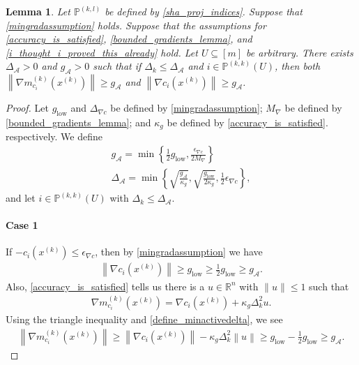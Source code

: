 \documentclass{article}
\newtheorem{lemma}[theorem]{Lemma}
\theoremstyle{case}
\numberwithin{theorem}{subsection}
\newcommand{\dk}{\Delta_k}
\newcommand{\gmcik}{{\nabla m_{c_i}^{(k)}\left(\xk\right)}}
\newcommand{\maxgrad}{{M_{\nabla}}}
\newcommand{\minactivegraddelta}{{\Delta_{\mathcal A}}}
\newcommand{\minactivegrad}{{ g_{\mathcal A} }}
\newcommand{\mingraddelta}{{\Delta_{\nabla c}}}
\newcommand{\mingradepsilon}{{\epsilon_{\nabla c}}}
\newcommand{\mingrad}{{ g_{\textrm{low}} }}
\newcommand{\Rn}{\mathbb R^n}
\newcommand{\xk}{x^{(k)}}
\newcommand{\activeprojkk}{{\mathbb P^{(k, k)}}}
\newcommand{\activeprojkl}{{\mathbb P^{(k, l)}}}
\begin{document}
\begin{lemma}
\label{active_gradients_bounded_below}
Let $\activeprojkl$ be defined by \cref{sha_proj_indices}.
Suppose that \cref{mingradassumption} holds.
Suppose that the assumptions for 
\cref{accuracy_is_satisfied}, \cref{bounded_gradients_lemma}, and \cref{i_thought_i_proved_this_already} hold.
Let $U \subseteq [m]$ be arbitrary.
There exists $\minactivegraddelta > 0$ and $\minactivegrad > 0$ such that if 
$\dk \le \minactivegraddelta$ and $i \in \activeprojkk(U)$, then both
$\left\|\gmcik\right\| \ge \minactivegrad$
and
$\left\|\nabla c_i\left(\xk\right)\right\| \ge \minactivegrad$.
\end{lemma}
\begin{proof}
Let 
$\mingrad$ and $\mingraddelta$
be defined by
\cref{mingradassumption};
$\maxgrad$ be defined by \cref{bounded_gradients_lemma};
and $\kappa_g$ be defined by \cref{accuracy_is_satisfied}.
respectively.
We define
\begin{align}
\minactivegrad = \min\left\{\frac 1 2 \mingrad, \frac {\mingradepsilon} {2 \maxgrad}  \right\} \label{define_minactivegrad} \\
\minactivegraddelta = \min\left\{\sqrt{\frac{\minactivegrad}{\kappa_g}}, \sqrt{\frac{\mingrad}{2\kappa_g}}, \frac 1 2 \mingradepsilon \right\}\label{define_minactivedelta}
,
\end{align}
and let $i \in \activeprojkk(U)$ with $\dk \le \minactivegraddelta$.
\paragraph{Case 1}
If $-c_i\left(\xk\right) \le \mingradepsilon$, then by \cref{mingradassumption} we have 
\begin{align*}
\left\|\nabla c_i\left(\xk\right)\right\| \ge \mingrad \ge \frac 1 2 \mingrad \ge \minactivegrad.
\end{align*}
Also, \cref{accuracy_is_satisfied} tells us there is a $u \in \Rn$ with $\|u\| \le 1$ such that
\begin{align}
\gmcik = \nabla c_i\left(\xk\right) + \kappa_g \dk^2 u. \label{mag_acc}
\end{align}
Using the triangle inequality and \cref{define_minactivedelta}, we see
\begin{align*}
\left\|\gmcik \right\| \ge \left\|\nabla c_i\left(\xk\right)\right\| - \kappa_g \dk^2 \left\|u\right\|
\ge \mingrad - \frac 1 2 \mingrad \ge \minactivegrad.
\end{align*}


\end{proof}
\end{document}
